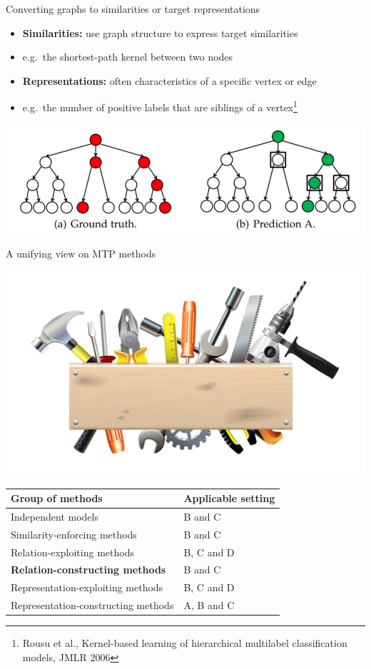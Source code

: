 \documentclass[]{beamer}
\renewcommand{\alert}[1]{\textbf{\color{putblue} #1}}
\begin{document}
\begin{frame}{Converting graphs to similarities or target representations}

\begin{itemize}
\item {\bf Similarities:} use graph structure to express target similarities
\item[] e.g.\ the shortest-path kernel between two nodes
\item {\bf Representations:}  often characteristics of a specific vertex or edge
\item[] e.g.\ the number of positive labels that are siblings of a vertex\footnote{Rousu et al., Kernel-based learning of hierarchical
multilabel classification models, JMLR 2006} 
\end{itemize}
\begin{center}
\includegraphics[scale=0.4,trim = 0 50 430 0,clip]{Figures/hloss}
\end{center}
\end{frame}

\begin{frame}{A unifying view on MTP methods}

\begin{center}
\includegraphics[scale=0.3]{pics/tools}

\begin{tabular}{ll}
\hline
Group of methods & Applicable setting \\
\hline
\hline
Independent models & B and C \\
Similarity-enforcing methods & B and C   \\ 
Relation-exploiting methods & B, C and D  \\
\alert{Relation-constructing methods} & B and C \\
Representation-exploiting methods & B, C and D \\
Representation-constructing methods & A, B and C \\
\hline  
\end{tabular}
\end{center}
\end{frame}
\end{document}
